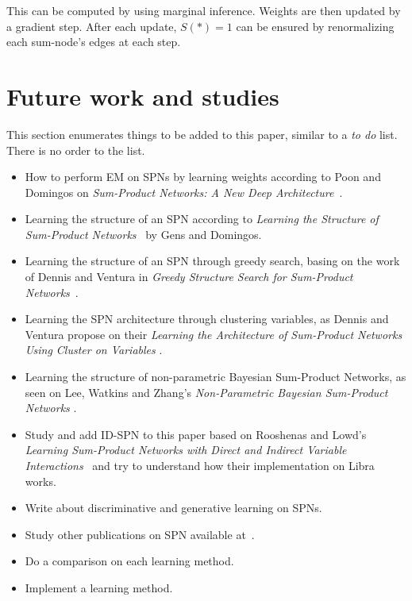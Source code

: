 \documentclass[a4paper,10pt]{article}
\theoremstyle{plain}
\begin{document}
This can be computed by using marginal inference. Weights are then updated by a gradient step.
After each update, $S(*)=1$ can be ensured by renormalizing each sum-node's edges at each step.

\newpage

\section{Future work and studies}

This section enumerates things to be added to this paper, similar to a \textit{to do} list. There
is no order to the list.

\begin{itemize}
  \item How to perform EM on SPNs by learning weights according to Poon and Domingos on
    \textit{Sum-Product Networks: A New Deep Architecture}~\cite{poon-domingos}.
  \item Learning the structure of an SPN according to \textit{Learning the Structure of
    Sum-Product Networks}~\cite{gens-domingos} by Gens and Domingos.
  \item Learning the structure of an SPN through greedy search, basing on the work of Dennis and
    Ventura in \textit{Greedy Structure Search for Sum-Product Networks}~\cite{greedy-search}.
  \item Learning the SPN architecture through clustering variables, as Dennis and Ventura propose
    on their \textit{Learning the Architecture of Sum-Product Networks Using Cluster on Variables}
    \cite{clustering}.
  \item Learning the structure of non-parametric Bayesian Sum-Product Networks, as seen on Lee,
    Watkins and Zhang's \textit{Non-Parametric Bayesian Sum-Product Networks}
    \cite{non-parametric-bayesian}.
  \item Study and add ID-SPN to this paper based on Rooshenas and Lowd's \textit{Learning
    Sum-Product Networks with Direct and Indirect Variable Interactions}~\cite{id-spn} and try to
    understand how their implementation on Libra~\cite{libra} works.
  \item Write about discriminative and generative learning on SPNs.
  \item Study other publications on SPN available at~\cite{website:spn-uwashington}.
  \item Do a comparison on each learning method.
  \item Implement a learning method.
\end{itemize}
\end{document}
